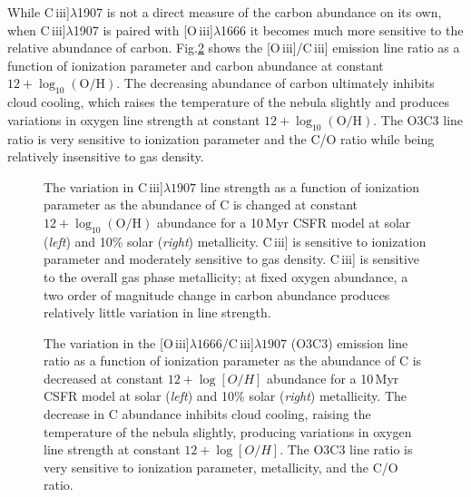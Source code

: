 \documentclass[preprint2,trackchanges]{aastex62}
\newcommand{\oiii}{[O\,{\sc iii}]\xspace}
\newcommand{\ciii}{C\,{\sc iii}]\xspace}
\newcommand{\Myr}{$\,$Myr\xspace}
\begin{document}
While \ciii$\lambda$1907 is not a direct measure of the carbon abundance on its own, when \ciii$\lambda$1907 is paired with \oiii$\lambda$1666 it becomes much more sensitive to the relative abundance of carbon. Fig.\ref{fig:COvarB} shows the \oiii/\ciii emission line ratio as a function of ionization parameter and carbon abundance at constant $12 + \log_{10} (\mathrm{O}/\mathrm{H})$. The decreasing abundance of carbon ultimately inhibits cloud cooling, which raises the temperature of the nebula slightly and produces variations in oxygen line strength at constant $12 + \log_{10} (\mathrm{O}/\mathrm{H})$. The O3C3 line ratio is very sensitive to ionization parameter and the C/O ratio while being relatively insensitive to gas density.
\begin{figure}
  \begin{center}
    \caption{The variation in \ciii$\lambda1907$ line strength as a function of ionization parameter as the abundance of C is changed at constant $12+\log_{10}(\mathrm{O}/\mathrm{H})$ abundance for a 10\Myr CSFR model at solar (\emph{left}) and 10\% solar (\emph{right}) metallicity. \ciii is sensitive to ionization parameter and moderately sensitive to gas density. \ciii is sensitive to the overall gas phase metallicity; at fixed oxygen abundance, a two order of magnitude change in carbon abundance produces relatively little variation in line strength.}
    \label{fig:COvarA}
  \end{center}
\end{figure}

\begin{figure}
  \begin{center}
    \caption{The variation in the \oiii$\lambda1666$/\ciii$\lambda1907$ (O3C3) emission line ratio as a function of ionization parameter as the abundance of C is decreased at constant $12+\log[O/H]$ abundance for a 10\Myr CSFR model at solar (\emph{left}) and 10\% solar (\emph{right}) metallicity. The decrease in C abundance inhibits cloud cooling, raising the temperature of the nebula slightly, producing variations in oxygen line strength at constant $12+\log[O/H]$. The O3C3 line ratio is very sensitive to ionization parameter, metallicity, and the C/O ratio.}
    \label{fig:COvarB}
  \end{center}
\end{figure}
\end{document}
